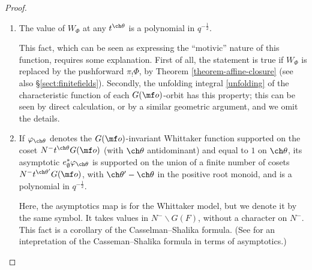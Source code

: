 \begin{proof}
\begin{enumerate}
 Indeed, the support of $\Phi$ lies in $H \xi t^{\mf c_X^-} G(\mf o)$, where $\xi$ is the diagonal image of $\begin{pmatrix} 1 & 0 \\ 1 & 1\end{pmatrix}$, and from the definition \eqref{unfolding} of the unfolding map, the support of $W_{\Phi}$ will lie in $H \xi N^- t^{\mf c_X^-}  G(\mf o) = N^- \mbb G_m t^{\mf c_X^-}  G(\mf o)$, where $\mbb G_m$ is embedded as in \eqref{Gmembedding}. But a $G(\mf o)$-invariant Whittaker function with respect to a character of $N^-$ whose conductor is $\mf o$ can only be supported on antidominant elements.

 When $g=1$, the integrand of \eqref{unfolding} only lies in the support of $\Phi$ when $n\in H_0\backslash N^-(\mf o)$.

 \item The value of $W_{\Phi}$ at any $t^{\ch\theta}$ is a polynomial in $q^{-\frac{1}{2}}$.

 This fact, which can be seen as expressing the ``motivic'' nature of this function, requires some explanation. First of all, the statement is true if $W_{\Phi}$ is replaced by the pushforward $\pi_! \Phi$, by Theorem \ref{theorem-affine-closure} (see also \S \ref{sect:finitefields}). Secondly, the unfolding integral \eqref{unfolding} of the characteristic function of each $G(\mf o)$-orbit has this property; this can be seen by direct calculation, or by a similar geometric argument, and we omit the details.

 \item If $\varphi_{\ch\theta}$ denotes the $G(\mf o)$-invariant Whittaker function supported on the coset $N^-t^{\ch\theta} G(\mf o)$ (with $\ch\theta$ antidominant) and equal to $1$ on $\ch\theta$, its asymptotic $e_\emptyset^* \varphi_{\ch\theta}$ is supported on the union of a finite number of cosets $N^-t^{\ch\theta'} G(\mf o)$, with $\ch\theta'-\ch\theta$ in the positive root monoid, and is a polynomial in $q^{-\frac{1}{2}}$.

 Here, the asymptotics map is for the Whittaker model, but we denote it by the same symbol. It takes values in $N^-\backslash G(F)$, without a character on $N^-$. This fact is a corollary of the Casselman--Shalika formula. (See \cite[Theorem 6.8 and Example 6.4]{SaSatake} for an intepretation of the Casseman--Shalika formula in terms of asymptotics.)


\end{enumerate}


\end{proof}
